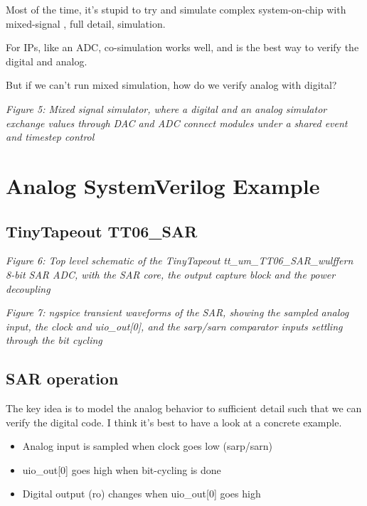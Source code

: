 Most of the time, it's stupid to try and simulate complex system-on-chip
with mixed-signal , full detail, simulation.

For IPs, like an ADC, co-simulation works well, and is the best way to
verify the digital and analog.

But if we can't run mixed simulation, how do we verify analog with
digital?


{
\centering
{}
}

\emph{Figure 5: Mixed signal simulator, where a digital and an analog
simulator exchange values through DAC and ADC connect modules under a
shared event and timestep control}

\section{Analog SystemVerilog
Example}\label{analog-systemverilog-example}

\subsection{TinyTapeout TT06\_SAR}\label{tinytapeout-tt06_sar}


{
\centering
{}
}

\emph{Figure 6: Top level schematic of the TinyTapeout
tt\_um\_TT06\_SAR\_wulffern 8-bit SAR ADC, with the SAR core, the output
capture block and the power decoupling}


{
\centering
{}
}

\emph{Figure 7: ngspice transient waveforms of the SAR, showing the
sampled analog input, the clock and uio\_out{[}0{]}, and the sarp/sarn
comparator inputs settling through the bit cycling}

\subsection{SAR operation}\label{sar-operation}

The key idea is to model the analog behavior to sufficient detail such
that we can verify the digital code. I think it's best to have a look at
a concrete example.

\begin{itemize}
\tightlist
\item
  Analog input is sampled when clock goes low (sarp/sarn)
\item
  uio\_out{[}0{]} goes high when bit-cycling is done
\item
  Digital output (ro) changes when uio\_out{[}0{]} goes high
\end{itemize}

